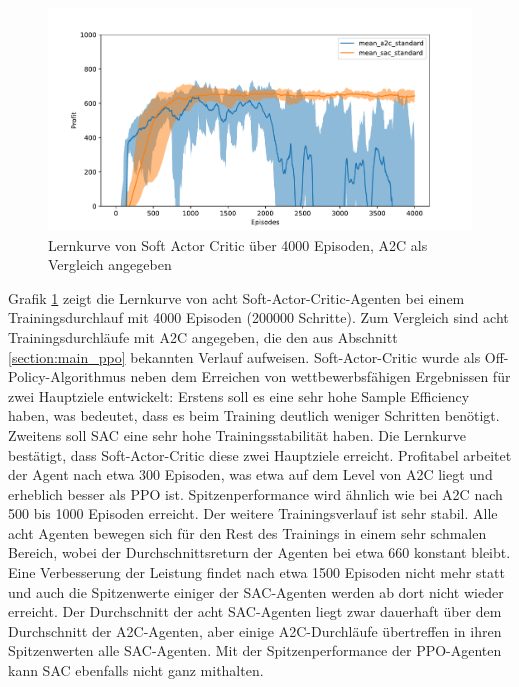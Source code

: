 \begin{figure}[htbp]
	\centering
	\includegraphics[width=\textwidth]{main/a2c_vs_sac.pdf}
	\caption{Lernkurve von Soft Actor Critic über 4000 Episoden, A2C als Vergleich angegeben}
	\label{grafic:SACLearningCurve}
\end{figure}

Grafik \ref{grafic:SACLearningCurve} zeigt die Lernkurve von acht Soft-Actor-Critic-Agenten bei einem Trainingsdurchlauf mit 4000 Episoden (200000 Schritte).
Zum Vergleich sind acht Trainingsdurchläufe mit A2C angegeben, die den aus Abschnitt \ref{section:main_ppo} bekannten Verlauf aufweisen.
Soft-Actor-Critic wurde als Off-Policy-Algorithmus neben dem Erreichen von wettbewerbsfähigen Ergebnissen für zwei Hauptziele entwickelt:
Erstens soll es eine sehr hohe Sample Efficiency haben, was bedeutet, dass es beim Training deutlich weniger Schritten benötigt.
Zweitens soll SAC eine sehr hohe Trainingsstabilität haben.
Die Lernkurve bestätigt, dass Soft-Actor-Critic diese zwei Hauptziele erreicht.
Profitabel arbeitet der Agent nach etwa 300 Episoden, was etwa auf dem Level von A2C liegt und erheblich besser als PPO ist.
Spitzenperformance wird ähnlich wie bei A2C nach 500 bis 1000 Episoden erreicht.
Der weitere Trainingsverlauf ist sehr stabil.
Alle acht Agenten bewegen sich für den Rest des Trainings in einem sehr schmalen Bereich, wobei der Durchschnittsreturn der Agenten bei etwa 660 konstant bleibt.
Eine Verbesserung der Leistung findet nach etwa 1500 Episoden nicht mehr statt und auch die Spitzenwerte einiger der SAC-Agenten werden ab dort nicht wieder erreicht.
Der Durchschnitt der acht SAC-Agenten liegt zwar dauerhaft über dem Durchschnitt der A2C-Agenten, aber einige A2C-Durchläufe übertreffen in ihren Spitzenwerten alle SAC-Agenten.
Mit der Spitzenperformance der PPO-Agenten kann SAC ebenfalls nicht ganz mithalten.

